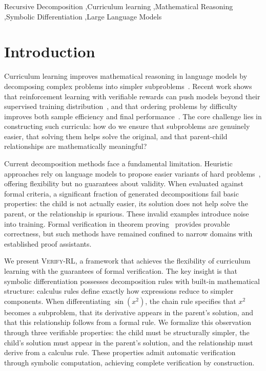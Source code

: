 \documentclass[a4paper,fleqn]{cas-dc}
\theoremstyle{definition}
\begin{document}
\begin{keywords}
Recursive Decomposition \sep Curriculum learning \sep Mathematical Reasoning \sep Symbolic Differentiation \sep Large Language Models
\end{keywords}


\maketitle
\section{Introduction}
\label{sec:introduction}

Curriculum learning improves mathematical reasoning in language models by decomposing complex problems into simpler subproblems~\cite{cot,gsm8k}. Recent work shows that reinforcement learning with verifiable rewards can push models beyond their supervised training distribution~\cite{deepseek-r1}, and that ordering problems by difficulty improves both sample efficiency and final performance~\cite{e2h2025_curriculum,dwl-curriculum}. The core challenge lies in constructing such curricula: how do we ensure that subproblems are genuinely easier, that solving them helps solve the original, and that parent-child relationships are mathematically meaningful?

Current decomposition methods face a fundamental limitation. Heuristic approaches rely on language models to propose easier variants of hard problems~\cite{ladder}, offering flexibility but no guarantees about validity. When evaluated against formal criteria, a significant fraction of generated decompositions fail basic properties: the child is not actually easier, its solution does not help solve the parent, or the relationship is spurious. These invalid examples introduce noise into training. Formal verification in theorem proving~\cite{deepseekprover2024,leancop2024} provides provable correctness, but such methods have remained confined to narrow domains with established proof assistants.

We present \textsc{Verify-RL}, a framework that achieves the flexibility of curriculum learning with the guarantees of formal verification. The key insight is that symbolic differentiation possesses decomposition rules with built-in mathematical structure: calculus rules define exactly how expressions reduce to simpler components. When differentiating $\sin(x^2)$, the chain rule specifies that $x^2$ becomes a subproblem, that its derivative appears in the parent's solution, and that this relationship follows from a formal rule. We formalize this observation through three verifiable properties: the child must be structurally simpler, the child's solution must appear in the parent's solution, and the relationship must derive from a calculus rule. These properties admit automatic verification through symbolic computation, achieving complete verification by construction.
\end{document}
